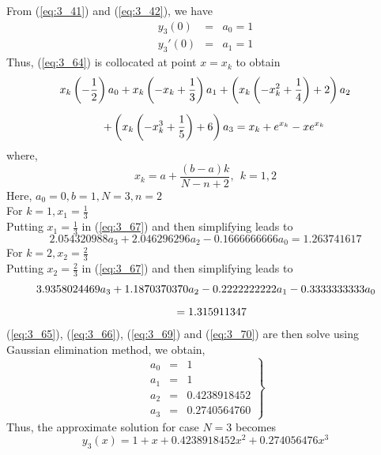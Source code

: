 \documentclass[12pt]{report}
\newcommand{\sps}{\\[0.2cm]}
\newcommand{\refn}[1]{(\ref{#1})}
\newcommand{\refx}[1]{\refn{eq:#1}}
\newcommand{\sprime}{'}
\begin{document}
	From \refx{3_41} and \refx{3_42}, we have
	\begin{eqnarray}
		y_3(0) &=&a_0  =1\label{eq:3_65}\sps
		y_3\sprime(0) &=&a_1 = 1 \label{eq:3_66}
	\end{eqnarray}
	Thus, \refx{3_64} is collocated at point $x=x_k$ to obtain
	\begin{eqnarray}
		x_k\left(-\frac{1}{2}\right)a_0 + x_k\left(-x_k + \frac{1}{3}\right)a_1 + \left(x_k \left(-x_k^2 + \frac{1}{4}\right)+2\right)a_2 \notag \sps
		+ \left(x_k\left(-x_k^3 + \frac{1}{5}\right)+6\right)a_3 = x_k +e^{x_k} - xe^{x_k}~~~~~~~ \label{eq:3_67}
	\end{eqnarray}
	where,
	\begin{equation}
		x_k = a + \frac{(b-a)k}{N-n+2}, ~~ k=1,2 \label{eq:3_68}
	\end{equation}
	Here, $a_0=0, b=1, N=3, n=2$\sps
	For $k=1, x_1=\frac{1}{3}$\sps
	Putting $x_1=\frac{1}{3}$ in \refx{3_67} and then simplifying leads to 
	\begin{equation}
		2.054320988a_3 + 2.046296296a_2 - 0.1666666666a_0 = 1.263741617 \label{eq:3_69}
	\end{equation}
	For $k=2, x_2 = \frac{2}{3}$\sps
	Putting $x_2=\frac{2}{3}$ in \refx{3_67} and then simplifying leads to 
	\begin{eqnarray}
		3.9358024469a_3 + 1.1870370370a_2 - 0.2222222222a_1 - 0.3333333333a_0 \notag \sps
		= 1.315911347 ~~~~~~~~~~~~~~~~~~~~~~~~~~~~~~~~~~~\label{eq:3_70}
	\end{eqnarray}
	\refx{3_65}, \refx{3_66}, \refx{3_69} and \refx{3_70} are then solve using Gaussian elimination method, we obtain,
	\begin{equation}
		\left. 
			\begin{array}{rcl}
				a_0 &=&1\sps
				a_1 &=&1\sps
				a_2 &=& 0.4238918452\sps
				a_3 &=& 0.2740564760
			\end{array}
		\right\}
		\label{eq:3_71}
	\end{equation}
	Thus, the approximate solution for case $N = 3$ becomes
	\begin{equation}
		y_3(x) = 1 + x + 0.4238918452x^2 + 0.274056476x^3 \label{eq:3_72}
	\end{equation}
	
	
\end{document}
